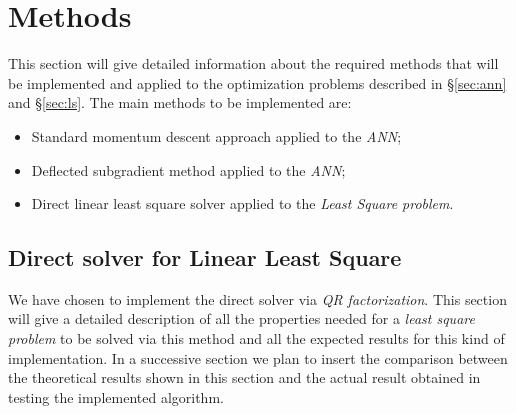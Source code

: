 \section{Methods}
This section will give detailed information about the required methods that will be implemented and applied to the optimization problems described in \S\ref{sec:ann} and \S\ref{sec:ls}. The main methods to be implemented are:
\begin{itemize}
    \item Standard momentum descent approach applied to the \textit{ANN};
    \item Deflected subgradient method applied to the \textit{ANN};
    \item Direct linear least square solver applied to the \textit{Least Square problem}.
\end{itemize}

\subsection{Direct solver for Linear Least Square}
\label{sec:qr}
We have chosen to implement the direct solver via \textit{QR factorization}. This section will give a detailed description of all the properties needed for a \textit{least square problem} to be solved via this method and all the expected results for this kind of implementation. In a successive section we plan to insert the comparison between the theoretical results shown in this section and the actual result obtained in testing the implemented algorithm.

